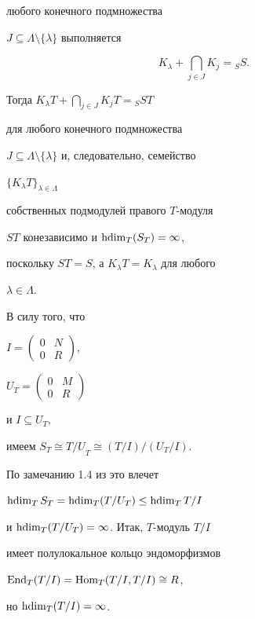 \begin{exam}
любого конечного подмножества


$J \subseteq \Lambda \setminus


\{\lambda \}$ выполняется


$$


K_\lambda + \bigcap_{j \in J} K_j = {_S}S.


$$


Тогда $K_\lambda T+ \bigcap_{j \in J} K_j T = {_S}S T$


для любого конечного подмножества


$J \subseteq \Lambda \setminus


\{\lambda \}$ и, следовательно, семейство 


$\{ K_\lambda T \}_{\lambda \in \Lambda}$ 


собственных подмодулей правого $T$-модуля 


$ST$ конезависимо и $\operatorname{hdim}_T(S_T)=\infty$, 


поскольку $ST=S$, а $K_\lambda T =K_{\lambda}$ для любого


$\lambda \in \Lambda$. 


В силу того, что


$I=\left(\begin{smallmatrix} {0} & {N} \\ {0} & {R}\end{smallmatrix}\right)$,


$U_T=


\left(\begin{smallmatrix}


{0} & {M} \\ {0} & {R} \end{smallmatrix}\right)$


и $I \subseteq U_T$,


имеем $S_T \cong {T/U}_T \cong (T/I)/(U_T/I)$. 


По замечанию 1.4 из \cite{lomp99} это влечет 


$\operatorname{hdim}_T{S_T} = \operatorname{hdim}_T (T/U_T) \leq \operatorname{hdim}_T{T/I}$ 


и $\operatorname{hdim}_T(T/U_T)= \infty$. Итак, $T$-модуль $T/I$ 


имеет полулокальное кольцо эндоморфизмов 


$\operatorname{End}_T(T/I)=\operatorname{Hom}_T(T/I,T/I) \cong R$,


но $\operatorname{hdim}_T(T/I)=\infty$.


\end{exam}





